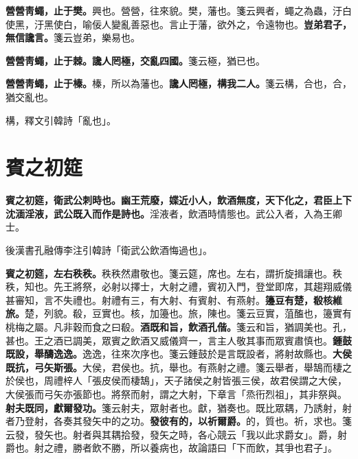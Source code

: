 \textbf{營營靑蠅，止于樊。}{\footnotesize 興也。營營，往來貌。樊，藩也。箋云興者，蠅之為蟲，汙白使黑，汙黑使白，喻佞人變亂善惡也。言止于藩，欲外之，令遠物也。}\textbf{豈弟君子，無信讒言。}{\footnotesize 箋云豈弟，樂易也。}

\textbf{營營靑蠅，止于棘。讒人罔極，交亂四國。}{\footnotesize 箋云極，猶已也。}

\textbf{營營靑蠅，止于榛。}{\footnotesize 榛，所以為藩也。}\textbf{讒人罔極，構我二人。}{\footnotesize 箋云構，合也，合，猶交亂也。}

\begin{quoting}構，釋文引韓詩「亂也」。\end{quoting}

\section{賓之初筵}


\textbf{賓之初筵，衛武公刺時也。幽王荒廢，媟近小人，飲酒無度，天下化之，君臣上下沈湎淫液，武公既入而作是詩也。}{\footnotesize 淫液者，飲酒時情態也。武公入者，入為王卿士。}

\begin{quoting}後漢書孔融傳李注引韓詩「衛武公飲酒悔過也」。\end{quoting}

\textbf{賓之初筵，左右秩秩。}{\footnotesize 秩秩然肅敬也。箋云筵，席也。左右，謂折旋揖讓也。秩秩，知也。先王將祭，必射以擇士，大射之禮，賓初入門，登堂即席，其趨翔威儀甚審知，言不失禮也。射禮有三，有大射、有賓射、有燕射。}\textbf{籩豆有楚，殽核維旅。}{\footnotesize 楚，列貌。殽，豆實也。核，加籩也。旅，陳也。箋云豆實，菹醢也，籩實有桃梅之屬。凡非穀而食之曰殽。}\textbf{酒既和旨，飲酒孔偕。}{\footnotesize 箋云和旨，猶調美也。孔，甚也。王之酒已調美，眾賓之飲酒又威儀齊一，言主人敬其事而眾賓肅慎也。}\textbf{鍾鼓既設，舉醻逸逸。}{\footnotesize 逸逸，往來次序也。箋云鍾鼓於是言既設者，將射故縣也。}\textbf{大侯既抗，弓矢斯張。}{\footnotesize 大侯，君侯也。抗，舉也。有燕射之禮。箋云舉者，舉鵠而棲之於侯也，周禮梓人「張皮侯而棲鵠」，天子諸侯之射皆張三侯，故君侯謂之大侯，大侯張而弓矢亦張節也。將祭而射，謂之大射，下章言「烝衎烈祖」，其非祭與。}\textbf{射夫既同，獻爾發功。}{\footnotesize 箋云射夫，眾射者也。獻，猶奏也。既比眾耦，乃誘射，射者乃登射，各奏其發矢中的之功。}\textbf{發彼有的，以祈爾爵。}{\footnotesize 的，質也。祈，求也。箋云發，發矢也。射者與其耦拾發，發矢之時，各心競云「我以此求爵女」。爵，射爵也。射之禮，勝者飲不勝，所以養病也，故論語曰「下而飲，其爭也君子」。}

